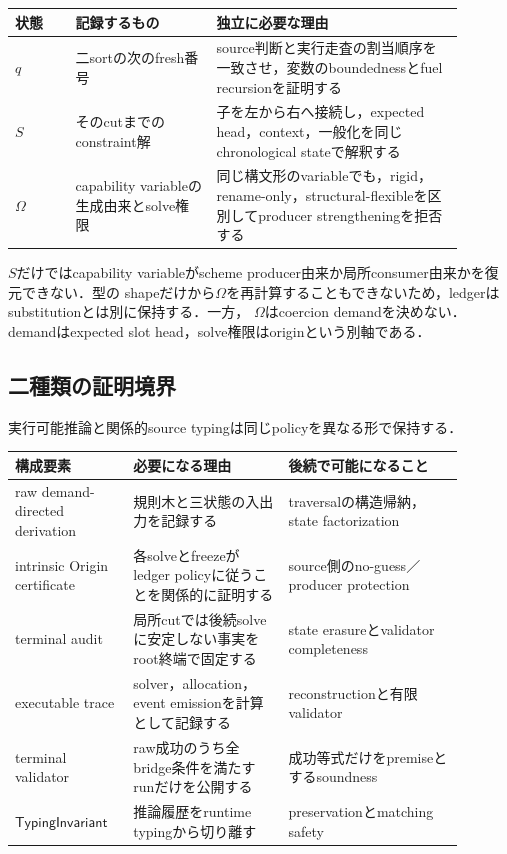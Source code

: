 \begin{center}
\begin{tabular}{p{0.12\linewidth}p{0.28\linewidth}p{0.49\linewidth}}
\toprule
状態 & 記録するもの & 独立に必要な理由 \\
\midrule
$q$
  & 二sortの次のfresh番号
  & source判断と実行走査の割当順序を一致させ，変数のboundednessとfuel recursionを証明する \\
$S$
  & そのcutまでのconstraint解
  & 子を左から右へ接続し，expected head，context，一般化を同じchronological stateで解釈する \\
$\Omega$
  & capability variableの生成由来とsolve権限
  & 同じ構文形のvariableでも，rigid，rename-only，structural-flexibleを区別してproducer strengtheningを拒否する \\
\bottomrule
\end{tabular}
\end{center}

$S$だけではcapability variableがscheme producer由来か局所consumer由来かを復元できない．型の
shapeだけから$\Omega$を再計算することもできないため，ledgerはsubstitutionとは別に保持する．一方，
$\Omega$はcoercion demandを決めない．demandはexpected slot head，solve権限はoriginという別軸である．

\subsection{二種類の証明境界}

実行可能推論と関係的source typingは同じpolicyを異なる形で保持する．

\begin{center}
\begin{tabular}{p{0.23\linewidth}p{0.31\linewidth}p{0.35\linewidth}}
\toprule
構成要素 & 必要になる理由 & 後続で可能になること \\
\midrule
raw demand-directed derivation
  & 規則木と三状態の入出力を記録する
  & traversalの構造帰納，state factorization \\
intrinsic Origin certificate
  & 各solveとfreezeがledger policyに従うことを関係的に証明する
  & source側のno-guess／producer protection \\
terminal audit
  & 局所cutでは後続solveに安定しない事実をroot終端で固定する
  & state erasureとvalidator completeness \\
executable trace
  & solver，allocation，event emissionを計算として記録する
  & reconstructionと有限validator \\
terminal validator
  & raw成功のうち全bridge条件を満たすrunだけを公開する
  & 成功等式だけをpremiseとするsoundness \\
$\mathsf{TypingInvariant}$
  & 推論履歴をruntime typingから切り離す
  & preservationとmatching safety \\
\bottomrule
\end{tabular}
\end{center}

